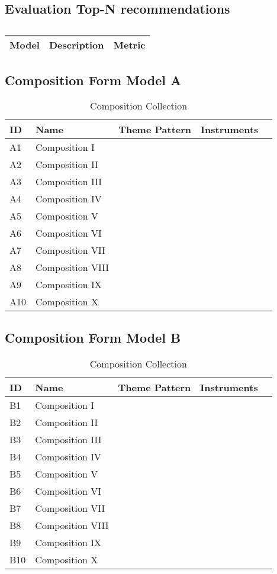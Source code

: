\subsection{Evaluation Top-N recommendations}

\centering	
\begin{table}[H]\tiny
	\caption{}	
	\begin{tabular}{r|p{4cm}|l}
		\hline	
		Model & Description & Metric \\
		\hline 
		\hline 
	\end{tabular}
\end{table}

\subsection{Composition Form Model A}

\begin{table}[H]
\caption{Composition Collection}	
\begin{tabular}{p{1cm}p{4cm}p{2cm}p{1cm}p{1cm}}
\hline
ID & Name & Theme Pattern & Instruments & \\
\hline 
A1 & Composition I &  &  & \\
A2 & Composition II &  &  & \\
A3 & Composition III &  & \\
A4 & Composition IV & & \\
A5 & Composition V & & & \\
\hline 
A6 & Composition VI &  &  & \\
A7 & Composition VII &  &  & \\
A8 & Composition VIII &  & \\
A9 & Composition IX & & \\
A10 & Composition X & & & \\
\end{tabular}
\end{table}

\subsection{Composition Form Model B}

\begin{table}[H]
\caption{Composition Collection}	
\begin{tabular}{p{1cm}p{4cm}p{2cm}p{1cm}p{1cm}}
\hline
ID & Name & Theme Pattern & Instruments & \\
\hline 
B1 & Composition I &  &  & \\
B2 & Composition II &  &  & \\
B3 & Composition III &  & \\
B4 & Composition IV & & \\
B5 & Composition V & & & \\
\hline 
B6 & Composition VI &  &  & \\
B7 & Composition VII &  &  & \\
B8 & Composition VIII &  & \\
B9 & Composition IX & & \\
B10 & Composition X & & & \\
\end{tabular}
\end{table}


